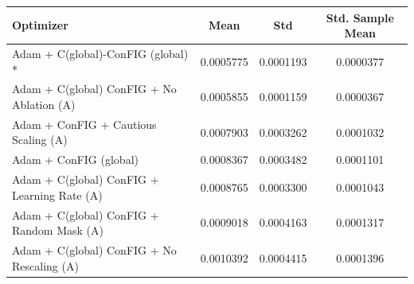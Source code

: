 \begin{table}[H]
    \centering
    \label{tab:optimizer_results}
    \begin{tabular}{lccc}
        \toprule
        \textbf{Optimizer} & \textbf{Mean} & \textbf{Std} & \textbf{Std. Sample Mean} \\
        \midrule
        Adam + C(global)-ConFIG (global) * & 0.0005775 & 0.0001193 & 0.0000377 \\
        Adam + C(global) ConFIG + No Ablation (A) & 0.0005855 & 0.0001159 & 0.0000367 \\
        Adam + ConFIG + Cautious Scaling (A) & 0.0007903 & 0.0003262 & 0.0001032 \\
        Adam + ConFIG (global) & 0.0008367 & 0.0003482 & 0.0001101 \\
        Adam + C(global) ConFIG +  Learning Rate (A) & 0.0008765 & 0.0003300 & 0.0001043 \\
        Adam + C(global) ConFIG + Random Mask (A) & 0.0009018 & 0.0004163 & 0.0001317 \\
        Adam + C(global) ConFIG +  No Rescaling (A) & 0.0010392 & 0.0004415 & 0.0001396 \\
        \bottomrule
    \end{tabular}
\end{table}
